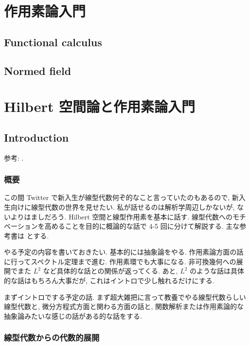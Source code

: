 \documentclass[openany, a4paper, oneside]{jsbook}
\begin{document}
\chapter{作用素論入門}

\section{Functional calculus}

\section{Normed field}

\chapter{Hilbert 空間論と作用素論入門}

\section{Introduction}

参考: \cite{KazuhikoAomoto1, AraiEzawa1, AraiEzawa2, AsaoArai4, HaimBrezis1, HaimBrezis2, HiaiYanagi1, KenichiKanaya1, NaokiKurasawa1, TomKoornwinder1, SeikiNishikawa1, NatsumeMoriyoshi1, NoborizakaOnishiYamamoto1, MakotoOkazaki1, KimYamamoto1, HiroshiTanaka1}.
\subsection{概要}

この間 Twitter で新入生が線型代数何ぞ的なこと言っていたのもあるので,
新入生向けに線型代数の世界を見せたい.
私が話せるのは解析学周辺しかないが, ないよりはましだろう.
Hilbert 空間と線型作用素を基本に話す.
線型代数へのモチベーションを高めることを目的に概論的な話で 4-5 回に分けて解説する.
主な参考書は \cite{HiaiYanagi1, AraiEzawa1, AraiEzawa2} とする.

やる予定の内容を書いておきたい.
基本的には抽象論をやる.
作用素論方面の話に行ってスペクトル定理まで進む.
作用素環でも大事になる.
非可換幾何への展開でまた $L^2$ など具体的な話との関係が返ってくる.
あと, $L^2$ のような話は具体的な話はもちろん大事だが, これはイントロで少し触れるだけにする.

まずイントロでする予定の話.
まず超大雑把に言って教養でやる線型代数らしい線型代数と,
微分方程式方面と関わる方面の話と, 関数解析または作用素論的な抽象論みたいな感じの話がある的な話をする.
\subsection{線型代数からの代数的展開}
\end{document}

